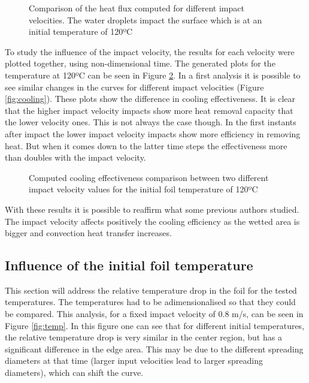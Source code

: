 \begin{figure}[h!]
\centering
\subfigure[t=2ms]{}
\subfigure[t=4ms]{}
\caption{Comparison of the heat flux computed for different impact velocities. The water droplets impact the surface which is at an initial temperature of 120ºC}
\label{fig:speedflux}
\end{figure}

\par To study the influence of the impact velocity, the results for each velocity were plotted together, using non-dimensional time. The generated plots for the temperature at 120ºC can be seen in Figure \ref{fig:speedcool}. In a first analysis it is possible to see similar changes in the curves for different impact velocities (Figure \ref{fig:cooling}). These plots show the difference in cooling effectiveness. It is clear that the higher impact velocity impacts show more heat removal capacity that the lower velocity ones. This is not always the case though. In the first instants after impact the lower impact velocity impacts show more efficiency in removing heat. But when it comes down to the latter time steps the effectiveness more than doubles with the impact velocity.\\

\begin{figure}[h]
\subfigure[Detail]{}
\caption{Computed cooling effectiveness comparison between two different impact velocity values for the initial foil temperature of 120ºC}
\label{fig:speedcool}
\end{figure}

\par With these results it is possible to reaffirm what some previous authors studied. The impact velocity affects positively the cooling efficiency as the wetted area is bigger and convection heat transfer increases.\\

\subsection{Influence of the initial foil temperature}

\par This section will address the relative temperature drop in the foil for the tested temperatures. The temperatures had to be adimensionalised  so that they could be compared. This analysis, for a fixed impact velocity of 0.8 m/s, can be seen in Figure \ref{fig:temp}. In this figure one can see that for different initial temperatures, the relative temperature drop is very similar in the center region, but has a significant difference in the edge area. This may be due to the different spreading diameters at that time (larger input velocities lead to larger spreading diameters), which can shift the curve.\\

